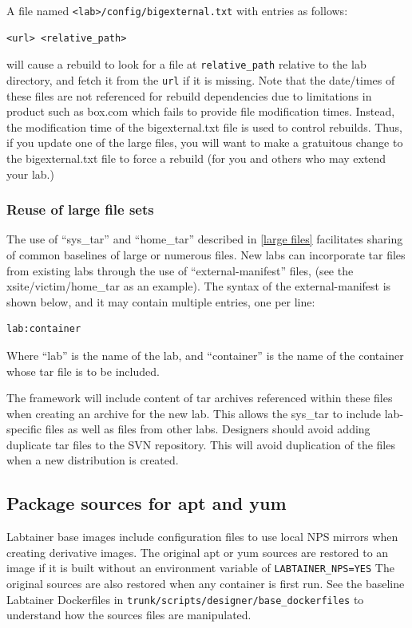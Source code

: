 \documentclass[12pt]{article}
\begin{document}
A file named {\tt <lab>/config/bigexternal.txt} with entries as follows:
\begin{verbatim}
<url> <relative_path>
\end{verbatim}
\noindent will cause a rebuild to look for a file at {\tt relative\_path} relative to the lab directory, and
fetch it from the {\tt url} if it is missing.  Note that the date/times of these files are not referenced for rebuild dependencies
due to limitations in product such as box.com which fails to provide file modification times.  Instead, the modification time of the
bigexternal.txt file is used to control rebuilds.  Thus, if you update one of the large files, you will want to make a gratuitous change
to the bigexternal.txt file to force a rebuild (for you and others who may extend your lab.)

\subsubsection{Reuse of large file sets}
\label{manifest}
The use of ``sys\_tar'' and ``home\_tar'' described in \ref{large files} facilitates sharing of common
baselines of large or numerous files.  New labs can incorporate tar files from existing
labs through the use of ``external-manifest'' files, (see the xsite/victim/home\_tar as
an example).   The syntax of the external-manifest is shown below, and it may contain
multiple entries, one per line:
\begin{verbatim}
lab:container
\end{verbatim}
\noindent Where ``lab'' is the name of the lab, and ``container'' is the name of the container
whose tar file is to be included.

The framework will include content of tar archives referenced within these files
when creating an archive for the new lab.  This allows the sys\_tar to include lab-specific files
as well as files from other labs.  Designers should avoid adding duplicate tar files to the SVN repository.
This will avoid duplication of the files when a new distribution is created.

\subsection{Package sources for apt and yum}
\label{package sources}
Labtainer base images include configuration files to use local NPS mirrors when creating derivative
images.  The original apt or yum sources are restored to an image if it is built without an environment
variable of {\tt LABTAINER\_NPS=YES}  The original sources are also restored when any container is first
run.  See the baseline Labtainer Dockerfiles in {\tt trunk/scripts/designer/base\_dockerfiles} to understand
how the sources files are manipulated.
\end{document}
